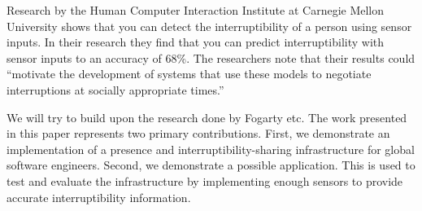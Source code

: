 \documentclass{sigchi}
\begin{document}
Research by the Human Computer Interaction Institute at Carnegie Mellon University \cite{Fogarty:2005:PHI:1057237.1057243} shows that you can detect the interruptibility of a person using sensor inputs.
In their research they find that you can predict interruptibility with sensor inputs to an accuracy of 68\%.
The researchers note that their results could ``motivate the development of systems that use these models to negotiate interruptions at socially appropriate times.''

We will try to build upon the research done by Fogarty etc.
The work presented in this paper represents two primary contributions.
First, we demonstrate an implementation of a presence and interruptibility-sharing infrastructure for global software engineers.
Second, we demonstrate a possible application. This is used to test and evaluate the infrastructure by implementing enough sensors to provide accurate interruptibility information.




\end{document}
